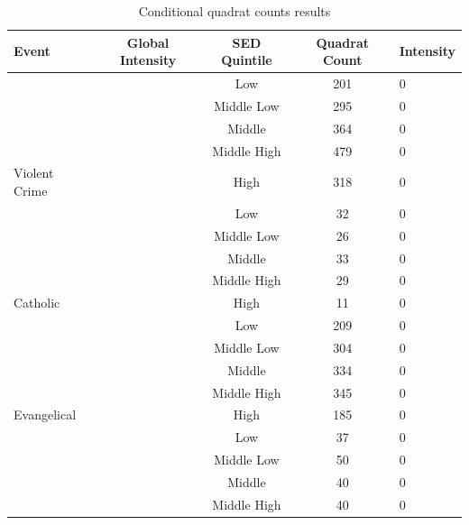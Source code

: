 \documentclass[smallextended]{svjour3}       %
\begin{document}
\begin{table}

\caption{\label{tab:table-counts-intensity-summary}\label{tab:quadrat-count-results}Conditional quadrat counts results}
\centering
\begin{tabular}[t]{lcccl}
\toprule
Event & Global Intensity & SED Quintile & Quadrat Count & Intensity\\
\midrule
 &  & Low & 201 & 0\\

 &  & Middle Low & 295 & 0\\

 &  & Middle & 364 & 0\\

 &  & Middle High & 479 & 0\\

\multirow{-5}{*}{\raggedright\arraybackslash Violent Crime} &  & High & 318 & 0\\

 &  & Low & 32 & 0\\

 &  & Middle Low & 26 & 0\\

 &  & Middle & 33 & 0\\

 &  & Middle High & 29 & 0\\

\multirow{-5}{*}{\raggedright\arraybackslash Catholic} &  & High & 11 & 0\\

 &  & Low & 209 & 0\\

 &  & Middle Low & 304 & 0\\

 &  & Middle & 334 & 0\\

 &  & Middle High & 345 & 0\\

\multirow{-5}{*}{\raggedright\arraybackslash Evangelical} &  & High & 185 & 0\\

 &  & Low & 37 & 0\\

 &  & Middle Low & 50 & 0\\

 &  & Middle & 40 & 0\\

 &  & Middle High & 40 & 0\\


\end{tabular}
\end{table}
\end{document}
